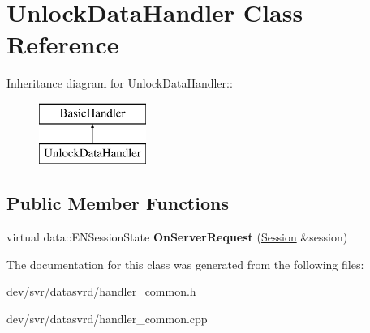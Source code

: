 \hypertarget{classUnlockDataHandler}{
\section{UnlockDataHandler Class Reference}
\label{classUnlockDataHandler}
}
Inheritance diagram for UnlockDataHandler::\begin{figure}[H]
\begin{center}
\leavevmode
\includegraphics[height=2cm]{classUnlockDataHandler}
\end{center}
\end{figure}
\subsection*{Public Member Functions}
\begin{DoxyCompactItemize}
\item 
\hypertarget{classUnlockDataHandler_a15b10449e6de4672b27230d7c6f7dffb}{
virtual data::ENSessionState {\bfseries OnServerRequest} (\hyperlink{classSession}{Session} \&session)}
\label{classUnlockDataHandler_a15b10449e6de4672b27230d7c6f7dffb}

\end{DoxyCompactItemize}


The documentation for this class was generated from the following files:\begin{DoxyCompactItemize}
\item 
dev/svr/datasvrd/handler\_\-common.h\item 
dev/svr/datasvrd/handler\_\-common.cpp\end{DoxyCompactItemize}

